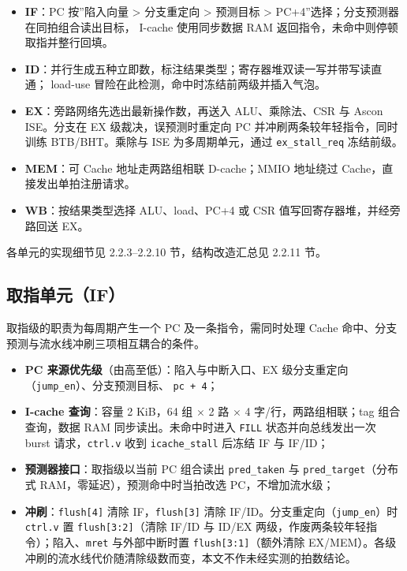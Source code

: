 
\begin{itemize}
\tightlist
\item
  \textbf{IF}：PC 按''陷入向量 \textgreater{} 分支重定向 \textgreater{} 预测目标 \textgreater{} PC+4''选择；分支预测器在同拍组合读出目标， I-cache 使用同步数据 RAM 返回指令，未命中则停顿取指并整行回填。
\item
  \textbf{ID}：并行生成五种立即数，标注结果类型；寄存器堆双读一写并带写读直通； load-use 冒险在此检测，命中时冻结前两级并插入气泡。
\item
  \textbf{EX}：旁路网络先选出最新操作数，再送入 ALU、乘除法、CSR 与 Ascon ISE。分支在 EX 级裁决，误预测时重定向 PC 并冲刷两条较年轻指令，同时训练 BTB/BHT。乘除与 ISE 为多周期单元，通过 \texttt{ex\_\allowbreak{}stall\_\allowbreak{}req} 冻结前级。
\item
  \textbf{MEM}：可 Cache 地址走两路组相联 D-cache；MMIO 地址绕过 Cache，直接发出单拍注册请求。
\item
  \textbf{WB}：按结果类型选择 ALU、load、PC+4 或 CSR 值写回寄存器堆，并经旁路回送 EX。
\end{itemize}

各单元的实现细节见 2.2.3--2.2.10 节，结构改造汇总见 2.2.11 节。

\Needspace{85pt}

\subsection{取指单元（IF）}\label{ux53d6ux6307ux5355ux5143if}

取指级的职责为每周期产生一个 PC 及一条指令，需同时处理 Cache 命中、分支预测与流水线冲刷三项相互耦合的条件。

\begin{itemize}
\tightlist
\item
  \textbf{PC 来源优先级}（由高至低）：陷入与中断入口、EX 级分支重定向（\texttt{jump\_\allowbreak{}en}）、分支预测目标、 \texttt{pc\ +\ 4}；
\item
  \textbf{I-cache 查询}：容量 2 KiB，64 组 $\times$ 2 路 $\times$ 4 字/行，两路组相联；tag 组合查询，数据 RAM 同步读出。未命中时进入 \texttt{FILL} 状态并向总线发出一次 burst 请求，\texttt{ctrl.\allowbreak{}v} 收到 \texttt{icache\_\allowbreak{}stall} 后冻结 IF 与 IF/ID；
\item
  \textbf{预测器接口}：取指级以当前 PC 组合读出 \texttt{pred\_\allowbreak{}taken} 与 \texttt{pred\_\allowbreak{}target}（分布式 RAM，零延迟），预测命中时当拍改选 PC，不增加流水级；
\item
  \textbf{冲刷}：\texttt{flush{[}4{]}} 清除 IF，\texttt{flush{[}3{]}} 清除 IF/ID。分支重定向（\texttt{jump\_\allowbreak{}en}）时 \texttt{ctrl.\allowbreak{}v} 置 \texttt{flush{[}3:2{]}}（清除 IF/ID 与 ID/EX 两级，作废两条较年轻指令）；陷入、\texttt{mret} 与外部中断时置 \texttt{flush{[}3:1{]}}（额外清除 EX/MEM）。各级冲刷的流水线代价随清除级数而变，本文不作未经实测的拍数结论。
\end{itemize}

